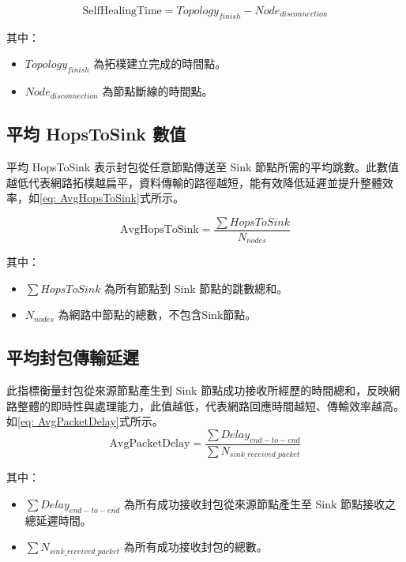 \begin{ZhChapter}
\begin{equation}
\label{eq: SelfHealingTime}
\text{SelfHealingTime} = Topology_{finish} - Node_{disconnection}
\end{equation}

其中：
\begin{itemize}
    \item $Topology_{finish}$ 為拓樸建立完成的時間點。
    \item $Node_{disconnection}$ 為節點斷線的時間點。
\end{itemize}

\subsection{平均 HopsToSink 數值}
平均 HopsToSink 表示封包從任意節點傳送至 Sink 節點所需的平均跳數。此數值越低代表網路拓樸越扁平，資料傳輸的路徑越短，能有效降低延遲並提升整體效率，如\ref{eq: AvgHopsToSink}式所示。

\begin{equation}
\label{eq: AvgHopsToSink}
\text{AvgHopsToSink} = \frac{\sum HopsToSink}{N_{nodes}}
\end{equation}

其中：
\begin{itemize}
    \item $\sum HopsToSink$ 為所有節點到 Sink 節點的跳數總和。
    \item $N_{nodes}$ 為網路中節點的總數，不包含Sink節點。
\end{itemize}

\subsection{平均封包傳輸延遲}
此指標衡量封包從來源節點產生到 Sink 節點成功接收所經歷的時間總和，反映網路整體的即時性與處理能力，此值越低，代表網路回應時間越短、傳輸效率越高。如\ref{eq: AvgPacketDelay}式所示。
\begin{equation}
\label{eq: AvgPacketDelay}
\text{AvgPacketDelay} = \frac{\sum Delay_{end-to-end}}{\sum N_{sink\_received\_packet}}
\end{equation}

其中：
\begin{itemize}
    \item $\sum Delay_{end-to-end}$ 為所有成功接收封包從來源節點產生至 Sink 節點接收之總延遲時間。
    \item $\sum N_{sink\_received\_packet}$ 為所有成功接收封包的總數。
\end{itemize}


\end{ZhChapter}

